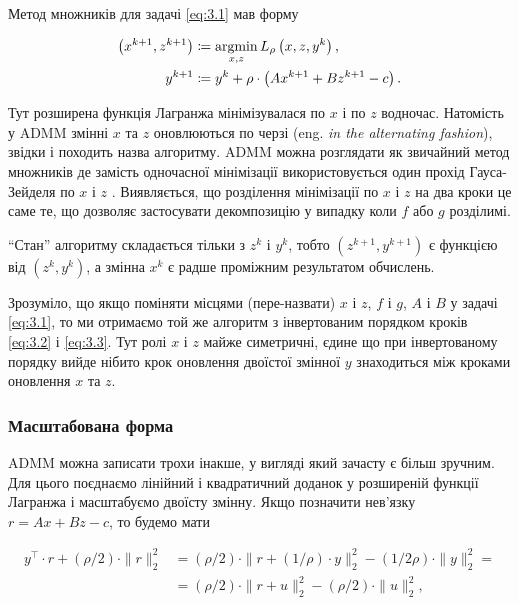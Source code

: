 Метод множників для задачі \eqref{eq:3.1} мав форму

\begin{align}
	\left( x^{k + 1}, z^{k + 1} \right) &\coloneqq 
	\operatorname*{argmin}_{x, z} L_\rho \left( x, z, y^k \right), \\
	y^{k + 1} &\coloneqq y^k + 
	\rho \cdot \left( A x^{k + 1} + B z^{k + 1} - c \right).
\end{align}

Тут розширена функція Лагранжа мінімізувалася по $x$ і по $z$ водночас.  Натомість у ADMM змінні $x$ та $z$ оновлюються по черзі (eng. \textit{in the alternating fashion}), звідки і походить назва алгоритму. ADMM можна розглядати як звичайний метод множників де замість одночасної мінімізації використовується один прохід Гауса-Зейделя по $x$ і $z$ \cite[\S10.1]{90}. Виявляється, що розділення мінімізації по $x$ і $z$ на два кроки це саме те, що дозволяє застосувати декомпозицію у випадку коли $f$ або $g$ розділимі. \medskip

\begin{remark}
    ``Стан'' алгоритму складається тільки з $z^k$ і $y^k$, тобто $\left( z^{k + 1}, y^{k + 1} \right)$ є функцією від $\left( z^k, y^k \right)$, а змінна $x^k$ є радше проміжним результатом обчислень.
\end{remark}

Зрозуміло, що якщо поміняти місцями (пере-назвати) $x$ і $z$, $f$ і $g$, $A$ і $B$ у задачі \eqref{eq:3.1}, то ми отримаємо той же алгоритм з інвертованим порядком кроків \eqref{eq:3.2} і \eqref{eq:3.3}. Тут ролі $x$ і $z$ майже симетричні, єдине що при інвертованому порядку вийде нібито крок оновлення двоїстої змінної $y$ знаходиться між кроками оновлення $x$ та $z$.

\subsubsection{Масштабована форма}

ADMM можна записати трохи інакше, у вигляді який зачасту є більш зручним. Для цього поєднаємо лінійний і квадратичний доданок у розширеній функції Лагранжа і масштабуємо двоїсту змінну. Якщо позначити нев'язку $r = A x + B z - c$, то будемо мати

\begin{align}
	y^\intercal \cdot r + (\rho / 2) \cdot \|r\|_2^2 &= (\rho / 2) \cdot \| r + (1 / \rho) \cdot y \|_2^2 - (1/2\rho) \cdot \|y\|_2^2 = \\
	 &= (\rho / 2) \cdot \| r + u \|_2^2 - (\rho/2) \cdot \|u\|_2^2,
\end{align}

